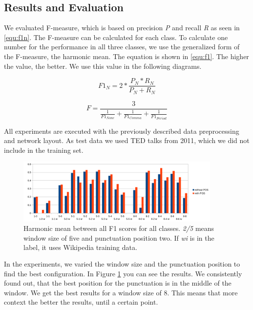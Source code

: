 \subsection{Results and Evaluation}

We evaluated F-measure, which is based on precision \emph{P} and recall \emph{R} as seen in \ref{equ:f1n}.
The F-measure can be calculated for each class.
To calculate one number for the performance in all three classes, we use the generalized form of the F-measure, the harmonic mean.
The equation is shown in \ref{equ:f1}.
The higher the value, the better.
We use this value in the following diagrams.

\begin{equation}
\label{equ:f1n}
F1_{N} = 2 * \frac{P_{N}* R_{N}}{P_{N}+R_{N}}
\end{equation}

\begin{equation}
\label{equ:f1}
F = \frac{3}{\frac{1}{F1_{None}} + \frac{1}{F1_{Comma}} + \frac{1}{F1_{Period}}}
\end{equation}

All experiments are executed with the previously described data preprocessing and network layout.
As test data we used TED talks from 2011, which we did not include in the training set.

\begin{figure}[ht]
    \centering
    \includegraphics[width=0.9\textwidth]{img/window_eval.png}
    \caption{Harmonic mean between all F1 scores for all classes. \emph{2/5} means window size of five and punctuation position two. If \emph{wi} is in the label, it uses Wikipedia training data.}
    \label{fig:window_eval}
\end{figure}

In the experiments, we varied the window size and the punctuation position to find the best configuration.
In Figure \ref{fig:window_eval} you can see the results.
We consistently found out, that the best position for the punctuation is in the middle of the window.
We get the best results for a window size of 8.
This means that more context the better the results, until a certain point.

